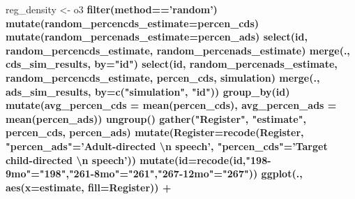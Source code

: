 \documentclass[
]{article}
\newenvironment{Shaded}{\begin{snugshade}}{\end{snugshade}}
\newcommand{\CharTok}[1]{\textcolor[rgb]{0.31,0.60,0.02}{#1}}
\newcommand{\CommentTok}[1]{\textcolor[rgb]{0.56,0.35,0.01}{\textit{#1}}}
\newcommand{\DataTypeTok}[1]{\textcolor[rgb]{0.13,0.29,0.53}{#1}}
\newcommand{\KeywordTok}[1]{\textcolor[rgb]{0.13,0.29,0.53}{\textbf{#1}}}
\newcommand{\NormalTok}[1]{#1}
\newcommand{\OperatorTok}[1]{\textcolor[rgb]{0.81,0.36,0.00}{\textbf{#1}}}
\newcommand{\StringTok}[1]{\textcolor[rgb]{0.31,0.60,0.02}{#1}}
\begin{document}
\begin{Shaded}
\begin{Highlighting}[]
\NormalTok{reg_density <-}\StringTok{ }\NormalTok{o3 }\OperatorTok{%
\StringTok{  }\KeywordTok{filter}\NormalTok{(method}\OperatorTok{==}\StringTok{'random'}\NormalTok{) }\OperatorTok{%
\StringTok{  }\KeywordTok{mutate}\NormalTok{(}\DataTypeTok{random_percencds_estimate=}\NormalTok{percen_cds) }\OperatorTok{%
\StringTok{  }\KeywordTok{mutate}\NormalTok{(}\DataTypeTok{random_percenads_estimate=}\NormalTok{percen_ads) }\OperatorTok{%
\StringTok{  }\KeywordTok{select}\NormalTok{(id, random_percencds_estimate, random_percenads_estimate) }\OperatorTok{%
\StringTok{  }\KeywordTok{merge}\NormalTok{(., cds_sim_results, }\DataTypeTok{by=}\StringTok{"id"}\NormalTok{) }\OperatorTok{%
\StringTok{  }\KeywordTok{select}\NormalTok{(id, random_percenads_estimate, random_percencds_estimate, percen_cds, simulation) }\OperatorTok{%
\StringTok{  }\KeywordTok{merge}\NormalTok{(., ads_sim_results, }\DataTypeTok{by=}\KeywordTok{c}\NormalTok{(}\StringTok{"simulation"}\NormalTok{, }\StringTok{"id"}\NormalTok{)) }\OperatorTok{%
\StringTok{  }\KeywordTok{group_by}\NormalTok{(id) }\OperatorTok{%
\StringTok{  }\KeywordTok{mutate}\NormalTok{(}\DataTypeTok{avg_percen_cds =} \KeywordTok{mean}\NormalTok{(percen_cds),}
         \DataTypeTok{avg_percen_ads =} \KeywordTok{mean}\NormalTok{(percen_ads)) }\OperatorTok{%
\StringTok{  }\KeywordTok{ungroup}\NormalTok{() }\OperatorTok{%
\StringTok{  }\KeywordTok{gather}\NormalTok{(}\StringTok{"Register"}\NormalTok{, }\StringTok{"estimate"}\NormalTok{, percen_cds, percen_ads) }\OperatorTok{%
\StringTok{  }\KeywordTok{mutate}\NormalTok{(}\DataTypeTok{Register=}\KeywordTok{recode}\NormalTok{(Register, }\StringTok{"percen_ads"}\NormalTok{=}\StringTok{'Adult-directed }\CharTok{\textbackslash{}n}\StringTok{ speech'}\NormalTok{, }\StringTok{"percen_cds"}\NormalTok{=}\StringTok{'Target child-directed }\CharTok{\textbackslash{}n}\StringTok{ speech'}\NormalTok{)) }\OperatorTok{%
\StringTok{  }\KeywordTok{mutate}\NormalTok{(}\DataTypeTok{id=}\KeywordTok{recode}\NormalTok{(id,}\StringTok{"198-9mo"}\NormalTok{=}\StringTok{"198"}\NormalTok{,}\StringTok{"261-8mo"}\NormalTok{=}\StringTok{"261"}\NormalTok{,}\StringTok{"267-12mo"}\NormalTok{=}\StringTok{"267"}\NormalTok{)) }\OperatorTok{%
\StringTok{  }\KeywordTok{ggplot}\NormalTok{(., }\KeywordTok{aes}\NormalTok{(}\DataTypeTok{x=}\NormalTok{estimate, }\DataTypeTok{fill=}\NormalTok{Register)) }\OperatorTok{+}
}}}}}}}}}}}}}}
\end{Highlighting}
\end{Shaded}
\end{document}

